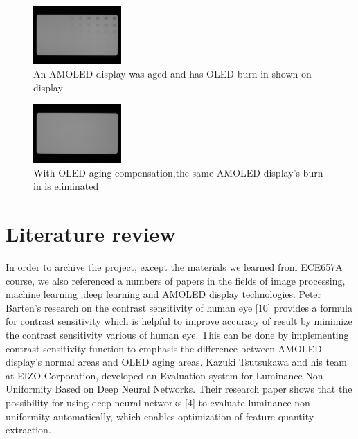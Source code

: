 \documentclass[runningheads]{llncs}
\begin{document}
\begin{figure}
    \centering
    \includegraphics[width=0.3\textwidth]{uncomp.jpeg}
    \caption{An AMOLED display was aged and has OLED burn-in shown on display}
    \label{fig:1}
\end{figure}
\begin{figure}
    \centering
    \includegraphics[width=0.3\textwidth]{comp.jpeg}
    \caption{With OLED aging compensation,the same AMOLED display's burn-in is eliminated}
    \label{fig:2}
\end{figure}

\section{Literature review}
In order to archive the project, except the materials we learned from ECE657A course, we also referenced a numbers of papers in the fields of image processing, machine learning ,deep learning and AMOLED display technologies.
Peter Barten’s research on the contrast sensitivity of human eye [10] provides a formula for contrast sensitivity which is helpful to improve accuracy of result by minimize the contrast sensitivity various of human eye. This can be done by implementing contrast sensitivity function to emphasis the difference between AMOLED display's normal areas and OLED aging areas.
Kazuki Tsutsukawa and his team at EIZO Corporation, developed an Evaluation system for Luminance Non-Uniformity Based on Deep Neural Networks. Their research paper shows that the possibility for using deep neural networks [4] to evaluate luminance non-uniformity automatically, which enables optimization of feature quantity extraction.
\end{document}
